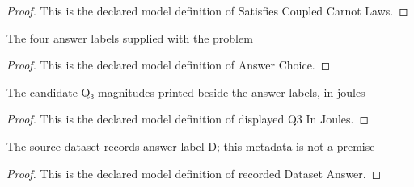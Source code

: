 \begin{proof}
  This is the declared model definition of Satisfies Coupled Carnot Laws.
\end{proof}
\begin{definition}
  \label{def:physics:phyx-mini-0424:phyxminiproblems-problemphyxmini0424-answerchoice}
  The four answer labels supplied with the problem
\end{definition}
\begin{proof}
  This is the declared model definition of Answer Choice.
\end{proof}
\begin{definition}
  \label{def:physics:phyx-mini-0424:phyxminiproblems-problemphyxmini0424-displayedq3injoules}
  The candidate Q₃ magnitudes printed beside the answer labels, in joules
\end{definition}
\begin{proof}
  This is the declared model definition of displayed Q3 In Joules.
\end{proof}
\begin{definition}
  \label{def:physics:phyx-mini-0424:phyxminiproblems-problemphyxmini0424-recordeddatasetanswer}
  The source dataset records answer label D; this metadata is not a premise
\end{definition}
\begin{proof}
  This is the declared model definition of recorded Dataset Answer.
\end{proof}
